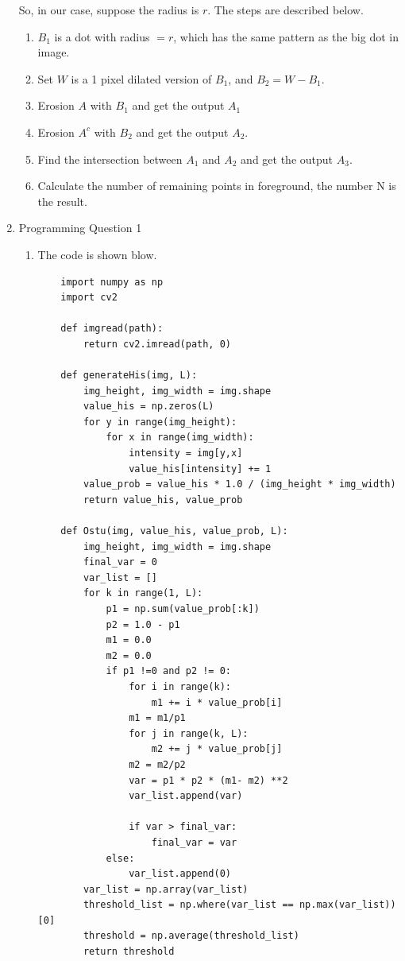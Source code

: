 \documentclass[12pt]{article}
\begin{document}
\begin{enumerate}[1]
So, in our case, suppose the radius is $r$. 
The steps are described below. 

\begin{enumerate}[Step1:]
    \item $B_1$ is a dot with radius $= r$, which has the same pattern as the big dot in image.
    \item Set $W$ is a 1 pixel dilated version of $B_1$, and $B_2 = W - B_1$.
    \item Erosion $A$ with $B_1$ and get the output $A_1$
    \item Erosion $A^c$ with $B_2$ and get the output $A_2$.
    \item Find the intersection between $A_1$ and $A_2$ and get the output $A_3$.
    \item Calculate the number of remaining points in foreground, the number N is the result.
\end{enumerate}



\item Programming Question 1 
\begin{enumerate}
\item The code is shown blow.
\begin{lstlisting}
    import numpy as np
    import cv2

    def imgread(path):
        return cv2.imread(path, 0)

    def generateHis(img, L):
        img_height, img_width = img.shape
        value_his = np.zeros(L)
        for y in range(img_height):
            for x in range(img_width):
                intensity = img[y,x]
                value_his[intensity] += 1
        value_prob = value_his * 1.0 / (img_height * img_width)
        return value_his, value_prob

    def Ostu(img, value_his, value_prob, L):
        img_height, img_width = img.shape
        final_var = 0
        var_list = []
        for k in range(1, L):
            p1 = np.sum(value_prob[:k])
            p2 = 1.0 - p1
            m1 = 0.0
            m2 = 0.0
            if p1 !=0 and p2 != 0:
                for i in range(k):
                    m1 += i * value_prob[i]
                m1 = m1/p1
                for j in range(k, L):
                    m2 += j * value_prob[j]
                m2 = m2/p2
                var = p1 * p2 * (m1- m2) **2
                var_list.append(var)

                if var > final_var:
                    final_var = var
            else:
                var_list.append(0)
        var_list = np.array(var_list)
        threshold_list = np.where(var_list == np.max(var_list))[0]
        threshold = np.average(threshold_list)
        return threshold


\end{lstlisting}
\end{enumerate}
\end{enumerate}
\end{document}
